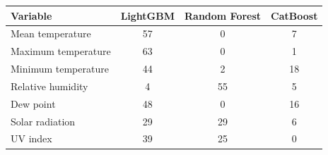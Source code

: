 \begin{tabular}{lccc}
\toprule
Variable & LightGBM & Random Forest & CatBoost \\
\midrule
Mean temperature      & 57 &  0 &  7 \\
Maximum temperature   & 63 &  0 &  1 \\
Minimum temperature   & 44 &  2 & 18 \\
Relative humidity     &  4 & 55 &  5 \\
Dew point             & 48 &  0 & 16 \\
Solar radiation       & 29 & 29 &  6 \\
UV index              & 39 & 25 &  0 \\
\bottomrule
\end{tabular}
